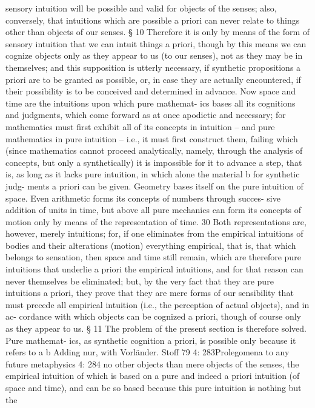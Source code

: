 sensory intuition will be possible and valid for objects of the senses; also,
conversely, that intuitions which are possible a priori can never relate to
things other than objects of our senses.
§ 10
Therefore it is only by means of the form of sensory intuition that we
can intuit things a priori, though by this means we can cognize objects
only as they appear to us (to our senses), not as they may be in themselves;
and this supposition is utterly necessary, if synthetic propositions a priori
are to be granted as possible, or, in case they are actually encountered,
if their possibility is to be conceived and determined in advance.
Now space and time are the intuitions upon which pure mathemat-
ics bases all its cognitions and judgments, which come forward as at
once apodictic and necessary; for mathematics must ﬁrst exhibit all of
its concepts in intuition – and pure mathematics in pure intuition – i.e.,
it must ﬁrst construct them, failing which (since mathematics cannot
proceed analytically, namely, through the analysis of concepts, but only a
synthetically) it is impossible for it to advance a step, that is, as long as
it lacks pure intuition, in which alone the material b for synthetic judg-
ments a priori can be given. Geometry bases itself on the pure intuition
of space. Even arithmetic forms its concepts of numbers through succes-
sive addition of units in time, but above all pure mechanics can form its
concepts of motion only by means of the representation of time. 30 Both
representations are, however, merely intuitions; for, if one eliminates
from the empirical intuitions of bodies and their alterations (motion)
everything empirical, that is, that which belongs to sensation, then space
and time still remain, which are therefore pure intuitions that underlie
a priori the empirical intuitions, and for that reason can never themselves
be eliminated; but, by the very fact that they are pure intuitions a priori,
they prove that they are mere forms of our sensibility that must precede
all empirical intuition (i.e., the perception of actual objects), and in ac-
cordance with which objects can be cognized a priori, though of course
only as they appear to us.
§ 11
The problem of the present section is therefore solved. Pure mathemat-
ics, as synthetic cognition a priori, is possible only because it refers to
a
b
Adding nur, with Vorländer.
Stoff
79
4: 283Prolegomena to any future metaphysics
4: 284
no other objects than mere objects of the senses, the empirical intuition
of which is based on a pure and indeed a priori intuition (of space and
time), and can be so based because this pure intuition is nothing but the

